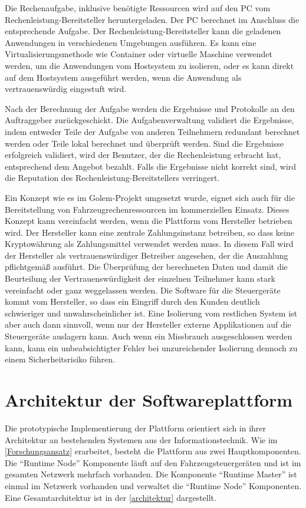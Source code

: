 Die Rechenaufgabe, inklusive benötigte Ressourcen wird auf den PC vom Rechenleistung-Bereitsteller heruntergeladen. Der PC berechnet im Anschluss die entsprechende Aufgabe. Der Rechenleistung-Bereitsteller kann die geladenen Anwendungen in verschiedenen Umgebungen ausführen. Es kann eine Virtualisierungsmethode wie Container oder virtuelle Maschine verwendet werden, um die Anwendungen vom Hostsystem zu isolieren, oder es kann direkt auf dem Hostsystem ausgeführt werden, wenn die Anwendung als vertrauenswürdig eingestuft wird. 

Nach der Berechnung der Aufgabe werden die Ergebnisse und Protokolle an den Auftraggeber zurückgeschickt. Die Aufgabenverwaltung validiert die Ergebnisse, indem entweder Teile der Aufgabe von anderen Teilnehmern redundant berechnet werden oder Teile lokal berechnet und überprüft werden. Sind die Ergebnisse erfolgreich validiert, wird der Benutzer, der die Rechenleistung erbracht hat, entsprechend dem Angebot bezahlt. Falls die Ergebnisse nicht korrekt sind, wird die Reputation des Rechenleistung-Bereitstellers verringert. 

Ein Konzept wie es im Golem-Projekt umgesetzt wurde, eignet sich auch für die Bereitstellung von Fahrzeugrechenressourcen im kommerziellen Einsatz. Dieses Konzept kann vereinfacht werden, wenn die Plattform vom Hersteller betrieben wird. Der Hersteller kann eine zentrale Zahlungsinstanz betreiben, so dass keine Kryptowährung als Zahlungsmittel verwendet werden muss. In diesem Fall wird der Hersteller als vertrauenswürdiger Betreiber angesehen, der die Auszahlung pflichtgemäß ausführt. Die Überprüfung der berechneten Daten und damit die Beurteilung der Vertrauenswürdigkeit der einzelnen Teilnehmer kann stark vereinfacht oder ganz weggelassen werden. Die Software für die Steuergeräte kommt vom Hersteller, so dass ein Eingriff durch den Kunden deutlich schwieriger und unwahrscheinlicher ist. Eine Isolierung vom restlichen System ist aber auch dann sinnvoll, wenn nur der Hersteller externe Applikationen auf die Steuergeräte auslagern kann. Auch wenn ein Missbrauch ausgeschlossen werden kann, kann ein unbeabsichtigter Fehler bei unzureichender Isolierung dennoch zu einem Sicherheitsrisiko führen. 

\section{Architektur der Softwareplattform}

Die prototypische Implementierung der Plattform orientiert sich in ihrer Architektur an bestehenden Systemen aus der Informationstechnik. Wie im \autoref{Forschungsansatz} erarbeitet, besteht die Plattform aus zwei Hauptkomponenten. Die \enquote{Runtime Node} Komponente läuft auf den Fahrzeugsteuergeräten und ist im gesamten Netzwerk mehrfach vorhanden. Die Komponente \enquote{Runtime Master} ist einmal im Netzwerk vorhanden und verwaltet die \enquote{Runtime Node} Komponenten. Eine Gesamtarchitektur ist in der \autoref{architektur} dargestellt.

